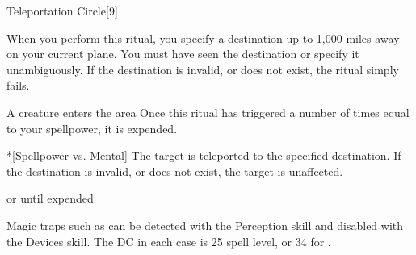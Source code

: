 \begin{spellsection}{Teleportation Circle}[9]
    \begin{spellheader}
    \end{spellheader}
    \begin{spellcontent}
        \begin{spelltargetinginfo}
        \end{spelltargetinginfo}
        \begin{spelleffects}
            \spellspecial When you perform this ritual, you specify a destination up to 1,000 miles away on your current plane. You must have seen the destination or specify it unambiguously. If the destination is invalid, or does not exist, the ritual simply fails.
            \begin{spelltrigger}{A creature enters the area}
                \spellspecial Once this ritual has triggered a number of times equal to your spellpower, it is expended.
                \begin{spelltarget}*[Spellpower vs. Mental]
                    \spelleffect The target is teleported to the specified destination. If the destination is invalid, or does not exist, the target is unaffected.
                \end{spelltarget}
            \end{spelltrigger}

            \spelldur \durext or until expended \dismissable
        \end{spelleffects}
    \end{spellcontent}
    \begin{spellfooter}
        \spellnotes Magic traps such as  can be detected with the Perception skill and disabled with the Devices skill. The DC in each case is 25 \add spell level, or 34 for .
    \end{spellfooter}
\end{spellsection}

